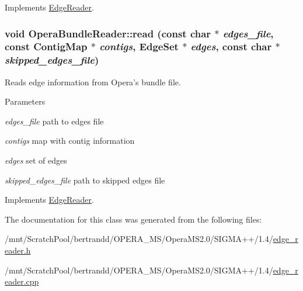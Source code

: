 Implements \hyperlink{classEdgeReader_a422beb33051ce84d62a600325aa058e1}{EdgeReader}.\hypertarget{classOperaBundleReader_ad85e56642c7d4b0c65dfbb2dbbf59029}{
\subsubsection[{read}]{\setlength{\rightskip}{0pt plus 5cm}void OperaBundleReader::read (const char $\ast$ {\em edges\_\-file}, \/  const {\bf ContigMap} $\ast$ {\em contigs}, \/  {\bf EdgeSet} $\ast$ {\em edges}, \/  const char $\ast$ {\em skipped\_\-edges\_\-file})}}
\label{classOperaBundleReader_ad85e56642c7d4b0c65dfbb2dbbf59029}


Reads edge information from Opera's bundle file. 
\begin{DoxyParams}{Parameters}
\item[{\em edges\_\-file}]path to edges file \item[{\em contigs}]map with contig information \item[{\em edges}]set of edges \item[{\em skipped\_\-edges\_\-file}]path to skipped edges file \end{DoxyParams}
 

Implements \hyperlink{classEdgeReader_a3c929904fe67018b74f4c180bada33dd}{EdgeReader}.

The documentation for this class was generated from the following files:\begin{DoxyCompactItemize}
\item 
/mnt/ScratchPool/bertrandd/OPERA\_\-MS/OperaMS2.0/SIGMA++/1.4/\hyperlink{edge__reader_8h}{edge\_\-reader.h}\item 
/mnt/ScratchPool/bertrandd/OPERA\_\-MS/OperaMS2.0/SIGMA++/1.4/\hyperlink{edge__reader_8cpp}{edge\_\-reader.cpp}\end{DoxyCompactItemize}
